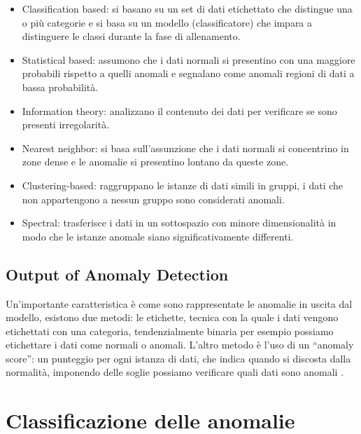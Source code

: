 \begin{itemize}
    \item Classification based: si basano su un set di dati etichettato che distingue una o più categorie e si basa su un modello (classificatore) che impara a distinguere le classi durante la fase di allenamento.
    \item Statistical based: assumono che i dati normali si presentino con una maggiore probabili rispetto a quelli anomali e segnalano come anomali regioni di dati a bassa probabilità.
    \item Information theory: analizzano il contenuto dei dati per verificare se sono presenti irregolarità.
    \item Nearest neighbor: si basa sull'assunzione che i dati normali si concentrino in zone dense e le anomalie si presentino lontano da queste zone.
    \item Clustering-based: raggruppano le istanze di dati simili in gruppi, i dati che non appartengono a nessun gruppo sono considerati anomali.
    \item Spectral: trasferisce i dati in un sottospazio con minore dimensionalità in modo che le istanze anomale siano significativamente differenti.
\end{itemize}



\subsection{Output of Anomaly Detection}

Un'importante caratteristica è come sono rappresentate le anomalie in uscita dal modello, esistono due metodi: le etichette, tecnica con la quale i dati vengono etichettati con una categoria, tendenzialmente binaria per esempio possiamo etichettare i dati come normali o anomali. L'altro metodo è l'uso di un ``anomaly score'': un punteggio per ogni istanza di dati, che indica quando si discosta dalla normalità, imponendo delle soglie possiamo verificare quali dati sono anomali \cite{anomaly_detection_survey_1_network, anomaly_detection_survey_2_deep_learning, anomaly_detection_survey_3}.


\section{Classificazione delle anomalie}

